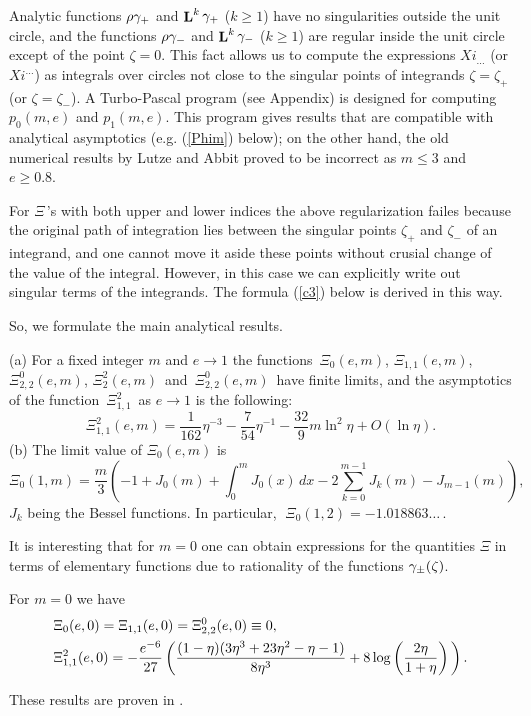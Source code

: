 Analytic functions
$\rho\gamma_+$ and  $\mathop{\bf L}\nolimits^k\gamma_+$    ($k\geq1$) have no
singularities outside the unit circle, and
the functions $\rho\gamma_-$ and $\mathop{\bf L}\nolimits^k\gamma_-$ ($k\geq1$)
are regular inside the unit circle except of
the point $\zeta=0$.
This fact allows us to
compute the expressions $Xi_{\dots}$ (or $Xi^{\dots}$)
as integrals over circles not close to
the singular  points   of   integrands   $\zeta=\zeta_+$   (or
$\zeta=\zeta_-$).
A Turbo-Pascal program  (see Appendix) is designed for
computing $p_0(m,e)$ and $p_1(m,e)$.
This program gives results that are compatible with analytical
asymptotics (e.g. (\ref{Phim}) below);
on the other hand, the old numerical results
by Lutze and Abbit \cite{lutze}
proved to be incorrect as $m\leq3$ and
$e\ge0.8$.

For $\Xi\,$'s with both upper and lower indices
the above regularization failes
because the original path of integration
lies between the singular points $\zeta_+$
and $\zeta_-$ of an integrand, and one
cannot move it aside these points without
crusial change of the value of the integral.
However, in this case we can explicitly
write out singular terms of the integrands.
The formula (\ref{c3}) below is derived in
this way.

So, we formulate the main analytical results.
\begin{tm}
{\rm (a)} For a fixed integer $m$ and $e\to1$ the
functions
$\,\Xi_{0}(e,m)$, $\Xi_{1,1}(e,m)$, $\Xi_{2,2}^{0}(e,m)$,
$\Xi_2^2(e,m)\,$ and $\,\Xi_{2,2}^{0}(e,m)\, $ have
finite limits, and the asymptotics\- of the function
$\,\Xi_{1,1}^{2}\,$ as $e\to 1$ is the following:
\begin{equation}
\label{c3}
\Xi_{1,1}^2(e,m)=\frac{1}{162}\eta^{-3}-\frac{7}{54}\eta^{-1}-
\frac{32}{9}m\ln^2\eta+O(\ln\eta).
\end{equation}
{\rm (b)} The limit value of  $\Xi_0(e,m)$ is
\begin{equation}
\label{Phim}
\Xi_0(1,m)=\frac{m}{3}\left(
-1+J_0(m)+\int_0^m
J_0(x)\,dx-2\sum_{k=0}^{m-1}J_k(m)-J_{m-1}(m)\right),
\end{equation}
$J_k$ being the Bessel functions. In particular,
$
\;\Xi_0(1,2)=-1.018863\dots\,.
$
\end{tm}

It is interesting that for $m=0$ one can obtain
expressions for the quantities $\Xi$ in terms
of elementary functions due to rationality
of the functions $\gamma_{\pm}(\zeta)$.
\begin{tm}
For  $m=0$ we have
\begin{eqnarray}
\nonumber
    & \Xi_0(e,0)=\Xi_{1,1}(e,0)=\Xi_{2,2}^{0}(e,0)\equiv 0,\\
\nonumber
    &\displaystyle \Xi_{1,1}^2(e,0)=
 -\frac{e^{-6}}{27}\left(
     \frac{(1-\eta)(3\eta^3+23\eta^2-\eta-1)}{8\eta^3}
     + 8\log\left(\frac{2\eta}{1+\eta}\right)\,
     \right).
\end{eqnarray}
\end{tm}
These results are proven in \cite{pr84, pr27}.

